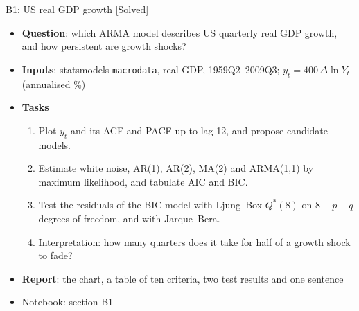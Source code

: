 \begin{frame}{B1: US real GDP growth [Solved]}
\itemsize{\footnotesize}
\begin{itemize}
\item \textbf{Question}: which ARMA model describes US quarterly real GDP growth, and how persistent are growth shocks?
\item \textbf{Inputs}: statsmodels \texttt{macrodata}, real GDP, 1959Q2--2009Q3; $y_t = 400\,\Delta\ln Y_t$ (annualised \%)
\item \textbf{Tasks}
\begin{enumerate}
    \item Plot $y_t$ and its ACF and PACF up to lag 12, and propose candidate models.
    \item Estimate white noise, AR(1), AR(2), MA(2) and ARMA(1,1) by maximum likelihood, and tabulate AIC and BIC.
    \item Test the residuals of the BIC model with Ljung--Box $Q^*(8)$ on $8 - p - q$ degrees of freedom, and with Jarque--Bera.
    \item Interpretation: how many quarters does it take for half of a growth shock to fade?
\end{enumerate}
\item \textbf{Report}: the chart, a table of ten criteria, two test results and one sentence
\item Notebook: section B1
\end{itemize}
\end{frame}

